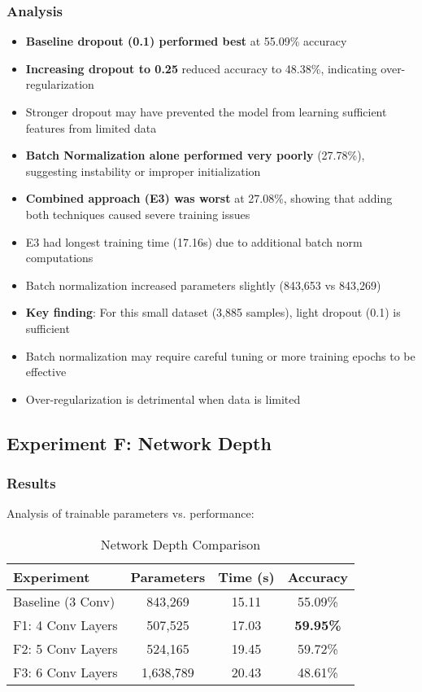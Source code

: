 \documentclass[12pt,a4paper]{article}
\begin{document}
\subsubsection{Analysis}
\begin{itemize}
    \item \textbf{Baseline dropout (0.1) performed best} at 55.09\% accuracy
    \item \textbf{Increasing dropout to 0.25} reduced accuracy to 48.38\%, indicating over-regularization
    \item Stronger dropout may have prevented the model from learning sufficient features from limited data
    \item \textbf{Batch Normalization alone performed very poorly} (27.78\%), suggesting instability or improper initialization
    \item \textbf{Combined approach (E3) was worst} at 27.08\%, showing that adding both techniques caused severe training issues
    \item E3 had longest training time (17.16s) due to additional batch norm computations
    \item Batch normalization increased parameters slightly (843,653 vs 843,269)
    \item \textbf{Key finding}: For this small dataset (3,885 samples), light dropout (0.1) is sufficient
    \item Batch normalization may require careful tuning or more training epochs to be effective
    \item Over-regularization is detrimental when data is limited
\end{itemize}

\subsection{Experiment F: Network Depth}

\subsubsection{Results}
Analysis of trainable parameters vs. performance:

\begin{table}[H]
\centering
\caption{Network Depth Comparison}
\begin{tabular}{lccc}
\toprule
\textbf{Experiment} & \textbf{Parameters} & \textbf{Time (s)} & \textbf{Accuracy} \\
\midrule
Baseline (3 Conv) & 843,269 & 15.11 & 55.09\% \\
F1: 4 Conv Layers & 507,525 & 17.03 & \textbf{59.95\%} \\
F2: 5 Conv Layers & 524,165 & 19.45 & 59.72\% \\
F3: 6 Conv Layers & 1,638,789 & 20.43 & 48.61\% \\
\bottomrule
\end{tabular}
\end{table}
\end{document}
